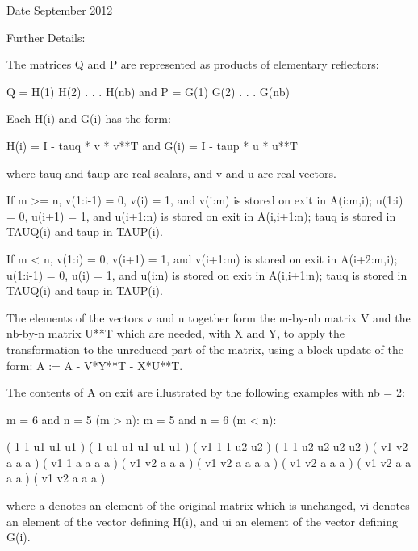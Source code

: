 \begin{DoxyDate}{Date}
September 2012 
\end{DoxyDate}
\begin{DoxyParagraph}{Further Details\+: }
\begin{DoxyVerb}  The matrices Q and P are represented as products of elementary
  reflectors:

     Q = H(1) H(2) . . . H(nb)  and  P = G(1) G(2) . . . G(nb)

  Each H(i) and G(i) has the form:

     H(i) = I - tauq * v * v**T  and G(i) = I - taup * u * u**T

  where tauq and taup are real scalars, and v and u are real vectors.

  If m >= n, v(1:i-1) = 0, v(i) = 1, and v(i:m) is stored on exit in
  A(i:m,i); u(1:i) = 0, u(i+1) = 1, and u(i+1:n) is stored on exit in
  A(i,i+1:n); tauq is stored in TAUQ(i) and taup in TAUP(i).

  If m < n, v(1:i) = 0, v(i+1) = 1, and v(i+1:m) is stored on exit in
  A(i+2:m,i); u(1:i-1) = 0, u(i) = 1, and u(i:n) is stored on exit in
  A(i,i+1:n); tauq is stored in TAUQ(i) and taup in TAUP(i).

  The elements of the vectors v and u together form the m-by-nb matrix
  V and the nb-by-n matrix U**T which are needed, with X and Y, to apply
  the transformation to the unreduced part of the matrix, using a block
  update of the form:  A := A - V*Y**T - X*U**T.

  The contents of A on exit are illustrated by the following examples
  with nb = 2:

  m = 6 and n = 5 (m > n):          m = 5 and n = 6 (m < n):

    (  1   1   u1  u1  u1 )           (  1   u1  u1  u1  u1  u1 )
    (  v1  1   1   u2  u2 )           (  1   1   u2  u2  u2  u2 )
    (  v1  v2  a   a   a  )           (  v1  1   a   a   a   a  )
    (  v1  v2  a   a   a  )           (  v1  v2  a   a   a   a  )
    (  v1  v2  a   a   a  )           (  v1  v2  a   a   a   a  )
    (  v1  v2  a   a   a  )

  where a denotes an element of the original matrix which is unchanged,
  vi denotes an element of the vector defining H(i), and ui an element
  of the vector defining G(i).\end{DoxyVerb}
 
\end{DoxyParagraph}
